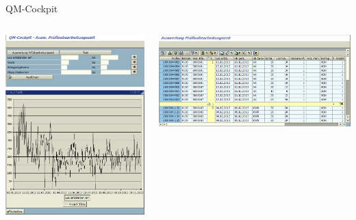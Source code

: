 \begin{frame}{QM-Cockpit}
	\begin{columns}
		\begin{column}{.5\textwidth}
			\centering
 			\includegraphics[width=\textwidth]{QMCockpit1.png}
			\\[2.1ex]
 			\includegraphics[width=\textwidth]{QMCockpit3.png}
		\end{column}
		\begin{column}{.5\textwidth}
			\centering
 			\includegraphics[width=\textwidth]{QMCockpit2.png}

\end{column}
\end{columns}
\end{frame}
